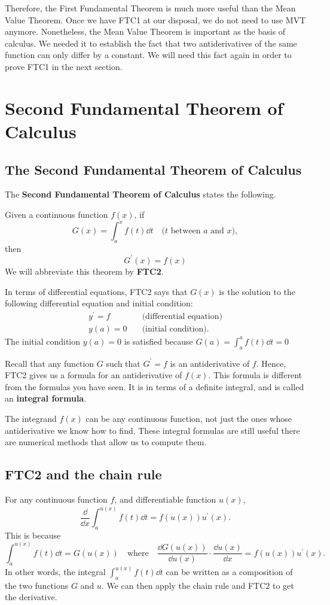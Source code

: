 Therefore, the First Fundamental Theorem is much more useful than the Mean Value Theorem. Once we have FTC1 at our disposal, we do not need to use MVT anymore. Nonetheless, the Mean Value Theorem is important as the basis of calculus. We needed it to establish the fact that two antiderivatives of the same function can only differ by a constant. We will need this fact again in order to prove FTC1 in the next section.
\section{Second Fundamental Theorem of Calculus}
\subsection{The Second Fundamental Theorem of Calculus}
The \textbf{Second Fundamental Theorem of Calculus} states the following.

Given a continuous function $f(x)$, if
\[G(x)=\int_a^xf(t)\dd t\quad\text{($t$ between $a$ and $x$)},\]
then
\[G^\prime(x)=f(x)\]
We will abbreviate this theorem by \textbf{FTC2}.

In terms of differential equations, FTC2 says that $G(x)$ is the solution to the following differential equation and initial condition:
\begin{align*}
  y^\prime=f\quad & \text{(differential equation)}\\
  y(a)=0\quad & \text{(initial condition).}
\end{align*}
The initial condition $y(a)=0$ is satisfied because $G(a)=\int_a^af(t)\dd t=0$

Recall that any function $G$ such that $G^\prime=f$ is an antiderivative of $f$. Hence, FTC2 gives us a formula for an antiderivative of $f(x)$. This formula is different from the formulas you have seen. It is in terms of a definite integral, and is called an \textbf{integral formula}.
\begin{note}
The integrand $f(x)$ can be any continuous function, not just the ones whose antiderivative we know how to find. These integral formulas are still useful there are numerical methods that allow us to compute them.
\end{note}
\subsection{FTC2 and the chain rule}
For any continuous function $f$, and differentiable function $u(x)$,
\[\frac\dd{\dd x}\int_a^{u(x)}f(t)\dd t=f\left(u(x)\right)u^\prime(x).\]
This is because
\[
  \int_a^{u(x)}f(t)\dd t=G\left(u(x)\right)
  \quad\text{where}\quad
  \frac{\dd G\left(u(x)\right)}{\dd u(x)}\cdot\frac{\dd u(x)}{\dd x}=f\left(u(x)\right)u^\prime(x).
\]
In other words, the integral $\int_a^{u(x)}f(t)\dd t$ can be written as a composition of the two functions $G$ and $u$. We can then apply the chain rule and FTC2 to get the derivative.
